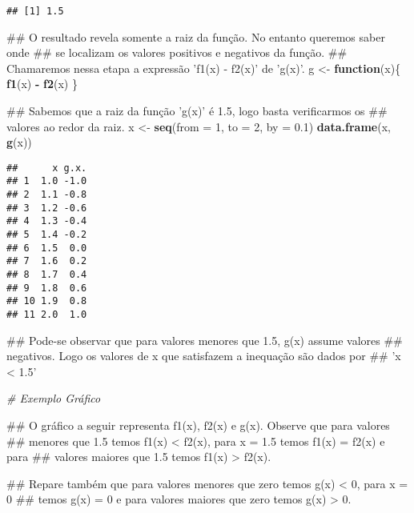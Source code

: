 \documentclass[]{book}
\newenvironment{Shaded}{\begin{snugshade}}{\end{snugshade}}
\newcommand{\KeywordTok}[1]{\textcolor[rgb]{0.13,0.29,0.53}{\textbf{#1}}}
\newcommand{\DataTypeTok}[1]{\textcolor[rgb]{0.13,0.29,0.53}{#1}}
\newcommand{\DecValTok}[1]{\textcolor[rgb]{0.00,0.00,0.81}{#1}}
\newcommand{\FloatTok}[1]{\textcolor[rgb]{0.00,0.00,0.81}{#1}}
\newcommand{\StringTok}[1]{\textcolor[rgb]{0.31,0.60,0.02}{#1}}
\newcommand{\CommentTok}[1]{\textcolor[rgb]{0.56,0.35,0.01}{\textit{#1}}}
\newcommand{\ControlFlowTok}[1]{\textcolor[rgb]{0.13,0.29,0.53}{\textbf{#1}}}
\newcommand{\OperatorTok}[1]{\textcolor[rgb]{0.81,0.36,0.00}{\textbf{#1}}}
\newcommand{\NormalTok}[1]{#1}
\begin{document}
\begin{enumerate}
\begin{verbatim}
## [1] 1.5
\end{verbatim}

\begin{Shaded}
\begin{Highlighting}[]
\NormalTok{##  O resultado revela somente a raiz da função. No entanto queremos saber onde}
\NormalTok{## se localizam os valores positivos e negativos da função.}
\NormalTok{##  Chamaremos nessa etapa a expressão 'f1(x) - f2(x)' de 'g(x)'.}
\NormalTok{g <-}\StringTok{ }\ControlFlowTok{function}\NormalTok{(x)\{}
  \KeywordTok{f1}\NormalTok{(x) }\OperatorTok{-}\StringTok{ }\KeywordTok{f2}\NormalTok{(x)}
\NormalTok{\}}

\NormalTok{##  Sabemos que a raiz da função 'g(x)' é 1.5, logo basta verificarmos os}
\NormalTok{## valores ao redor da raiz.}
\NormalTok{x <-}\StringTok{ }\KeywordTok{seq}\NormalTok{(}\DataTypeTok{from =} \DecValTok{1}\NormalTok{, }\DataTypeTok{to =} \DecValTok{2}\NormalTok{, }\DataTypeTok{by =} \FloatTok{0.1}\NormalTok{)}
\KeywordTok{data.frame}\NormalTok{(x, }\KeywordTok{g}\NormalTok{(x))}
\end{Highlighting}
\end{Shaded}

\begin{verbatim}
##      x g.x.
## 1  1.0 -1.0
## 2  1.1 -0.8
## 3  1.2 -0.6
## 4  1.3 -0.4
## 5  1.4 -0.2
## 6  1.5  0.0
## 7  1.6  0.2
## 8  1.7  0.4
## 9  1.8  0.6
## 10 1.9  0.8
## 11 2.0  1.0
\end{verbatim}

\begin{Shaded}
\begin{Highlighting}[]
\NormalTok{##  Pode-se observar que para valores menores que 1.5, g(x) assume valores}
\NormalTok{## negativos. Logo os valores de x que satisfazem a inequação são dados por}
\NormalTok{## 'x < 1.5'}

\CommentTok{# Exemplo Gráfico}

\NormalTok{##  O gráfico a seguir representa f1(x), f2(x) e g(x). Observe que para valores}
\NormalTok{## menores que 1.5 temos f1(x) < f2(x), para x = 1.5 temos f1(x) = f2(x) e para}
\NormalTok{## valores maiores que 1.5 temos f1(x) > f2(x).}

\NormalTok{##  Repare também que para valores menores que zero temos g(x) < 0, para x = 0}
\NormalTok{## temos g(x) = 0 e para valores maiores que zero temos g(x) > 0.}


\end{Highlighting}
\end{Shaded}
\end{enumerate}
\end{document}
